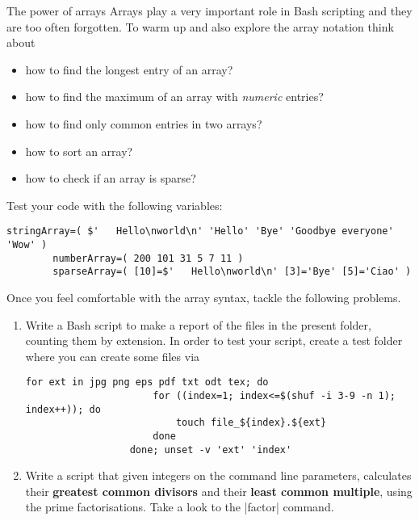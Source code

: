 
\begin{exercise}[Instructive]{The power of arrays}
    Arrays play a very important role in Bash scripting and they are too often forgotten.
    To warm up and also explore the array notation think about
    \begin{itemize}[nosep]
        \item how to find the longest entry of an array?
        \item how to find the maximum of an array with \emph{numeric} entries?
        \item how to find only common entries in two arrays?
        \item how to sort an array?
        \item how to check if an array is sparse?
    \end{itemize}
    Test your code with the following variables:
    \begin{lstlisting}[style=MyBash, emph={[2]stringArray, numberArray, sparseArray}]
        stringArray=( $'   Hello\nworld\n' 'Hello' 'Bye' 'Goodbye everyone' 'Wow' )
        numberArray=( 200 101 31 5 7 11 )
        sparseArray=( [10]=$'   Hello\nworld\n' [3]='Bye' [5]='Ciao' )
    \end{lstlisting}

    Once you feel comfortable with the array syntax, tackle the following problems.
    \begin{enumerate}[after=\vspace{-\baselineskip}]
        \item Write a Bash script to make a report of the files in the present folder, counting them by extension.
              In order to test your script, create a test folder where you can create some files via
              \begin{lstlisting}[style=MyBash, emph={[2]ext, index}, alsoletter={0123456789![]/\{\}.:}]
                  for ext in jpg png eps pdf txt odt tex; do
                      for ((index=1; index<=$(shuf -i 3-9 -n 1); index++)); do
                          touch file_${index}.${ext}
                      done
                  done; unset -v 'ext' 'index'
              \end{lstlisting}
        \item Write a script that given integers on the command line parameters, calculates their \textbf{greatest common divisors} and their \textbf{least common multiple}, using the prime factorisations.
              Take a look to the \bash|factor| command.
    \end{enumerate}
    \bigskip
\end{exercise}
